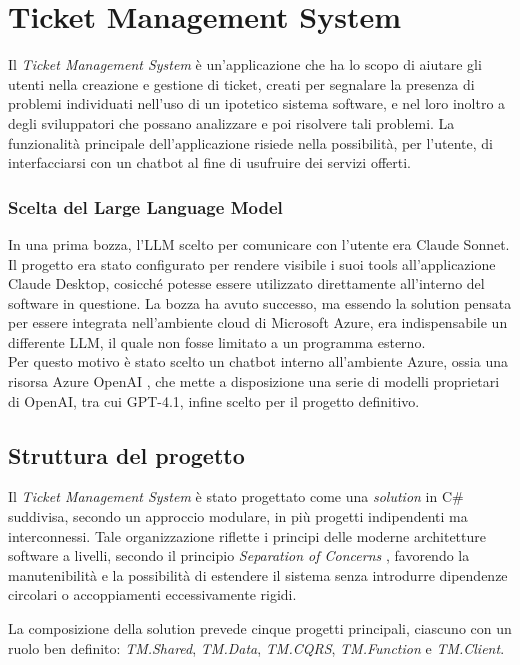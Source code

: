 \chapter{Ticket Management System}

Il \textit{Ticket Management System} è un'applicazione che ha lo scopo di aiutare gli utenti nella creazione e gestione di ticket,
creati per segnalare la presenza di problemi individuati nell'uso di un ipotetico sistema software, e nel loro inoltro a degli sviluppatori
che possano analizzare e poi risolvere tali problemi. La funzionalità principale dell'applicazione risiede nella possibilità, per l'utente, 
di interfacciarsi con un chatbot al fine di usufruire dei servizi offerti.

\subsection{Scelta del Large Language Model}
In una prima bozza, l'LLM scelto per comunicare con l'utente era Claude Sonnet. Il progetto era stato configurato per rendere visibile i suoi
tools all'applicazione Claude Desktop, cosicché potesse essere utilizzato direttamente all'interno del software in questione. La bozza ha avuto successo, ma
essendo la solution pensata per essere integrata nell'ambiente cloud di Microsoft Azure, era indispensabile un differente LLM, il quale non fosse
limitato a un programma esterno. \\
Per questo motivo è stato scelto un chatbot interno all'ambiente Azure, ossia una risorsa Azure OpenAI \cite{azure_openai_foundry}, che mette a disposizione
una serie di modelli proprietari di OpenAI, tra cui GPT-4.1, infine scelto per il progetto definitivo.

\newpage
\section{Struttura del progetto}
Il \textit{Ticket Management System} è stato progettato come una \textit{solution} in C\# suddivisa, secondo un approccio modulare,
in più progetti indipendenti ma interconnessi. Tale organizzazione riflette i principi delle moderne architetture software a livelli,
secondo il principio \textit{Separation of Concerns} \cite{msdn2009separation}, favorendo la manutenibilità e la possibilità di estendere il sistema
senza introdurre dipendenze circolari o accoppiamenti eccessivamente rigidi.

La composizione della solution prevede cinque progetti principali, ciascuno con un ruolo ben definito: \textit{TM.Shared}, \textit{TM.Data},
\textit{TM.CQRS}, \textit{TM.Function} e \textit{TM.Client}.

